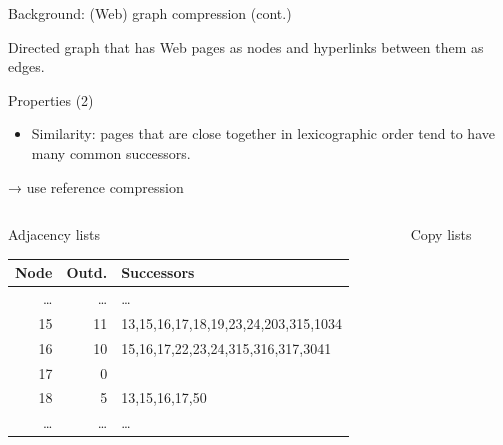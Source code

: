 \documentclass[aspectratio=169,xcolor=table]{beamer}
\begin{document}
    \begin{frame}{Background: (Web) graph compression (cont.)}
        \begin{definition}
            Directed graph that has Web pages as nodes and hyperlinks between them as
            edges.
        \end{definition}
        \begin{block}{Properties (2)}
            \begin{itemize}
                \item \alert{\alert{Similarity:}} pages that are close together in lexicographic order tend
                    to have many common successors.
            \end{itemize}
            → use \alert{reference compression}
        \end{block}
        \begin{columns}
            \begin{column}{0.47\columnwidth}
                \begin{block}{Adjacency lists}
                    \scriptsize
                    \begin{center}
                        \begin{tabular}{rrl}
                            \alert{Node} & \alert{Outd.} & \alert{Successors}\\
                            \hline
                            \ldots{} & \ldots{} & \ldots{}\\
                            15 & 11 & 13,15,16,17,18,19,23,24,203,315,1034\\
                            16 & 10 & 15,16,17,22,23,24,315,316,317,3041\\
                            17 & 0 & \\
                            18 & 5 & 13,15,16,17,50\\
                            \ldots{} & \ldots{} & \ldots{}\\
                        \end{tabular}
                    \end{center}
                \end{block}
            \end{column}
            \begin{column}{0.60\columnwidth}
                \begin{block}{Copy lists}
                    \scriptsize
                    \begin{center}

\end{center}
\end{block}
\end{column}
\end{columns}
\end{frame}
\end{document}
